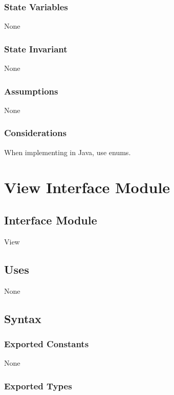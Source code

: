 \documentclass[12pt]{article}
\begin{document}
\subsubsection* {State Variables}

None

\subsubsection* {State Invariant}

None

\subsubsection* {Assumptions}

None

\subsubsection* {Considerations}

When implementing in Java, use enums.

\newpage

\section* {View Interface Module}

\subsection*{Interface Module}

View

\subsection* {Uses}

None

\subsection* {Syntax}

\subsubsection* {Exported Constants}

None

\subsubsection* {Exported Types}
\end{document}
